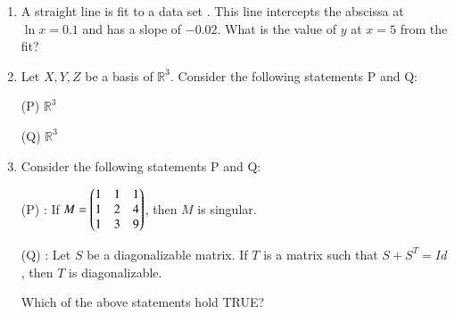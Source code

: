 \documentclass[journal]{IEEEtran}
\numberwithin{equation}{enumi}
\numberwithin{figure}{enumi}
\begin{document}
\begin{enumerate}
\hfill{}

\item A straight line is fit to a data set . This line intercepts the abscissa at $\ln x = 0.1$ and has a slope of $-0.02$. What is the value of $y$ at $x = 5$ from the fit?

\begin{enumerate}
\end{enumerate}

\hfill{}
\item Let ${X, Y, Z}$ be a basis of $\mathbb{R}^3.$ Consider the following statements P and Q:

(P)   $\mathbb{R}^3$

(Q)   $\mathbb{R}^3$


\begin{enumerate}
\end{enumerate}

\hfill{}

\item Consider the following statements P and Q:

(P) : If $M = \begin{pmatrix}1 & 1 & 1 \\ 1 & 2 & 4 \\ 1 & 3 & 9\end{pmatrix}$, then $M$ is singular.

(Q) : Let $S$ be a diagonalizable matrix. If $T$ is a matrix such that $S + S^T = Id$, then $T$ is diagonalizable.

Which of the above statements hold TRUE?

\begin{enumerate}
\end{enumerate}


\end{enumerate}
\end{document}
